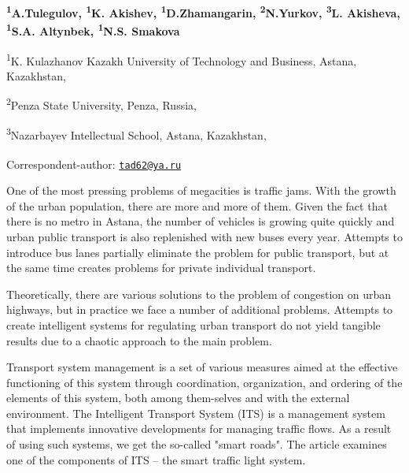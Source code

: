 
\begin{articleheader}

{\bfseries \textsuperscript{1}A.Tulegulov\textsuperscript{\envelope },
\textsuperscript{1}K. Akishev, \textsuperscript{1}D.Zhamangarin,
\textsuperscript{2}N.Yurkov, \textsuperscript{3}L. Akisheva, \textsuperscript{1}S.A. Altynbek, \textsuperscript{1}N.S. Smakova}
\end{articleheader}

\begin{affiliation}
\textsuperscript{1}K. Kulazhanov Kazakh University of Technology and
Business, Astana, Kazakhstan,

\textsuperscript{2}Penza State University, Penza, Russia,

\textsuperscript{3}Nazarbayev Intellectual School, Astana, Kazakhstan,

\raggedright {\bfseries \textsuperscript{\envelope }}Correspondent-author: \href{mailto:tad62@ya.ru}{\nolinkurl{tad62@ya.ru}}
\end{affiliation}

One of the most pressing problems of megacities is traffic jams. With
the growth of the urban population, there are more and more of them.
Given the fact that there is no metro in Astana, the number of vehicles
is growing quite quickly and urban public transport is also replenished
with new buses every year. Attempts to introduce bus lanes partially
eliminate the problem for public transport, but at the same time creates
problems for private individual transport.

Theoretically, there are various solutions to the problem of congestion
on urban highways, but in practice we face a number of additional
problems. Attempts to create intelligent systems for regulating urban
transport do not yield tangible results due to a chaotic approach to the
main problem.

Transport system management is a set of various measures aimed at the
effective functioning of this system through coordination, organization,
and ordering of the elements of this system, both among them-selves and
with the external environment. The Intelligent Transport System (ITS) is
a management system that implements innovative developments for managing
traffic flows. As a result of using such systems, we get the so-called
"smart roads". The article examines one of the components of ITS -- the
smart traffic light system.

